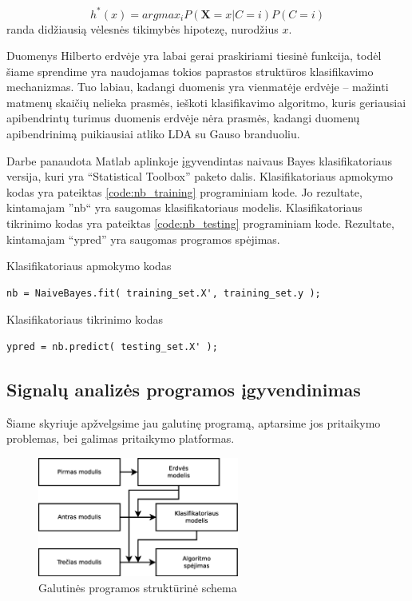 \documentclass[]{vgtuef}
\begin{document}
\begin{equation}
h^*(x) = arg max_i P(\mathbf{X}=x|C=i)P(C=i)
\end{equation}
randa didžiausią vėlesnės tikimybės hipotezę, nurodžius $x$.

Duomenys Hilberto erdvėje yra labai gerai praskiriami tiesinė funkcija, todėl šiame sprendime yra naudojamas tokios paprastos struktūros klasifikavimo mechanizmas. Tuo labiau, kadangi duomenis yra vienmatėje erdvėje -- mažinti matmenų skaičių nelieka prasmės, ieškoti klasifikavimo algoritmo, kuris geriausiai apibendrintų turimus duomenis erdvėje nėra prasmės, kadangi duomenų apibendrinimą puikiausiai atliko LDA su Gauso branduoliu.

Darbe panaudota Matlab aplinkoje įgyvendintas naivaus Bayes klasifikatoriaus versija, kuri yra ``Statistical Toolbox'' paketo dalis. Klasifikatoriaus apmokymo kodas yra pateiktas \ref{code:nb_training} programiniam kode. Jo rezultate, kintamajam ''nb`` yra saugomas klasifikatoriaus modelis. Klasifikatoriaus tikrinimo kodas yra pateiktas \ref{code:nb_testing} programiniam kode. Rezultate, kintamajam ``ypred'' yra saugomas programos spėjimas.

\begin{cfigure}
	\centering
	\caption{Klasifikatoriaus apmokymo kodas}
	\label{code:nb_training}
	\begin{lstlisting}
nb = NaiveBayes.fit( training_set.X', training_set.y );
  \end{lstlisting}
\end{cfigure}

\begin{cfigure}
	\centering
	\caption{Klasifikatoriaus tikrinimo kodas}
	\label{code:nb_testing}
	\begin{lstlisting}
ypred = nb.predict( testing_set.X' );
  \end{lstlisting}
\end{cfigure}

\subsection{Signalų analizės programos įgyvendinimas}
\label{subsec:total_program}

Šiame skyriuje apžvelgsime jau galutinę programą, aptarsime jos pritaikymo problemas, bei galimas pritaikymo platformas.

\begin{figure}[!t]
  \centering
  \includegraphics[width=250px]{figures/galutine_programa.eps}
  \caption{Galutinės programos struktūrinė schema}
  \label{fig:galutine_programa}
\end{figure}
\end{document}
